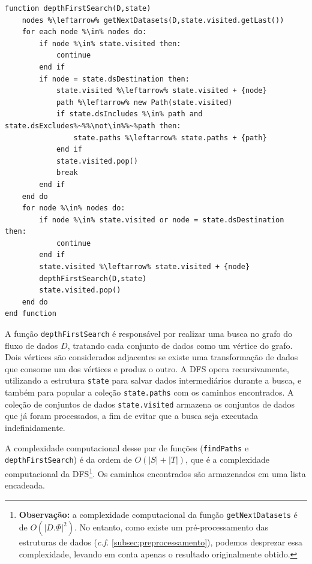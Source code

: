 \begin{minipage}[c]{0.95\textwidth}
\begin{lstlisting}[language=pseudocode,label={lst:algorithm-dfs},caption={[Busca em Profundidade (DFS) dos caminhos]Depth First Search (DFS): busca em profundidade de todos os caminhos entre dois conjuntos de dados.}]
function depthFirstSearch(D,state)
    nodes %\leftarrow% getNextDatasets(D,state.visited.getLast())
    for each node %\in% nodes do:
        if node %\in% state.visited then:
            continue
        end if
        if node = state.dsDestination then:
            state.visited %\leftarrow% state.visited + {node}
            path %\leftarrow% new Path(state.visited)
            if state.dsIncludes %\in% path and state.dsExcludes%~%%\not\in%%~%path then:
                state.paths %\leftarrow% state.paths + {path}
            end if
            state.visited.pop()
            break
        end if
    end do
    for node %\in% nodes do:
        if node %\in% state.visited or node = state.dsDestination then:
            continue
        end if
        state.visited %\leftarrow% state.visited + {node}
        depthFirstSearch(D,state)
        state.visited.pop()
    end do
end function
\end{lstlisting}
\end{minipage}

A função \texttt{depthFirstSearch} é responsável por realizar uma busca no grafo do fluxo de dados \(D\), tratando cada conjunto de dados como um vértice do grafo. Dois vértices são considerados adjacentes se existe uma transformação de dados que consome um dos vértices e produz o outro. A DFS opera recursivamente, utilizando a estrutura \texttt{state} para salvar dados intermediários durante a busca, e também para popular a coleção \texttt{state.paths} com os caminhos encontrados. A coleção de conjuntos de dados \texttt{state.visited} armazena os conjuntos de dados que já foram processados, a fim de evitar que a busca seja executada indefinidamente.

A complexidade computacional desse par de funções (\texttt{findPaths} e \texttt{depthFirstSearch}) é da ordem de \(O(|S| + |T|)\), que é a complexidade computacional da DFS\footnote{\textbf{Observação:} a complexidade computacional da função \texttt{getNextDatasets} é de $O(|D.\Phi|^2)$. No entanto, como existe um pré-processamento das estruturas de dados (\textit{c.f.} \autoref{subsec:preprocessamento}), podemos desprezar essa complexidade, levando em conta apenas o resultado originalmente obtido.}. Os caminhos encontrados são armazenados em uma lista encadeada.

